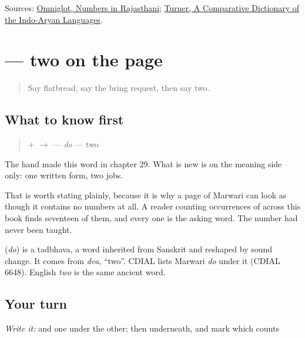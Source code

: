 \begin{tcolorbox}[breakable,colback=teal!4,colframe=teal!35!black,title={Before you move on}]
Sources: \href{https://www.omniglot.com/language/numbers/rajasthani.htm}{Omniglot, Numbers in Rajasthani}; \href{https://dsal.uchicago.edu/dictionaries/soas/}{Turner, A Comparative Dictionary of the Indo-Aryan Languages}.
\end{tcolorbox}
\section[\texorpdfstring{\mw{दो} (do)}{दो (do)}]{ — two on the page}

\label{lesson:MW-C32-do-two}



\begin{quote}
Say flatbread, say the bring request, then say two.
\end{quote}

\subsection*{What to know first}
\begin{quote}
\textbf{} + \textbf{} $\to$ \textbf{} — \emph{do} — two
\end{quote}

The hand made this word in chapter 29. What is new is on the meaning side only: one written form, two jobs.

That is worth stating plainly, because it is why a page of Marwari can look as though it contains no numbers at all. A reader counting occurrences of \textbf{} across this book finds seventeen of them, and every one is the asking word. The number had never been taught.

\begin{cousinweb}
\textbf{} (\emph{do}) is a tadbhava, a word inherited from Sanskrit and reshaped by sound change. It comes from \emph{dva}, \textquotedblleft{}two\textquotedblright{}. CDIAL lists Marwari \emph{do} under it (CDIAL 6648). English \emph{two} is the same ancient word.
\end{cousinweb}

\subsection*{Your turn}
\emph{Write it:} \textbf{} and \textbf{} one under the other; then \textbf{ } underneath, and mark which \textbf{} counts

